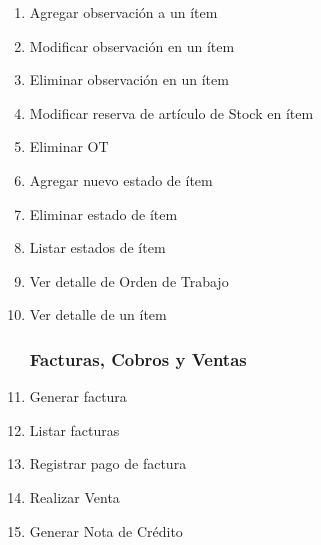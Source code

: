 \documentclass[12pt]{extarticle}
\begin{document}
\begin{spacing}{1.2}
\begin{multicols}{2}
\begin{enumerate}
            \item Agregar observación a un ítem
            \item Modificar observación en un ítem
            \item Eliminar observación en un ítem
            \item Modificar reserva de artículo de Stock en ítem
            \item Eliminar OT

            \item Agregar nuevo estado de ítem
            \item Eliminar estado de ítem
            \item Listar estados de ítem

            \item Ver detalle de Orden de Trabajo
            \item Ver detalle de un ítem
        \subsubsection*{Facturas, Cobros y Ventas}
            \item Generar factura 
            \item Listar facturas
            \item Registrar pago de factura
            \item Realizar Venta
            \item Generar Nota de Crédito

\end{enumerate}
\end{multicols}
\end{spacing}
\end{document}
